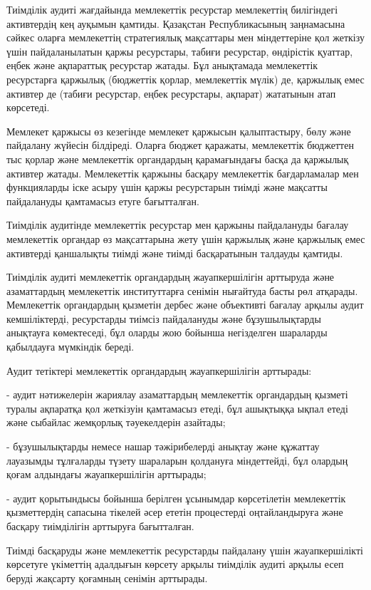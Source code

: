 \begin{multicols}{2}
Тиімділік аудиті жағдайында мемлекеттік ресурстар мемлекеттің
билігіндегі активтердің кең ауқымын қамтиды. Қазақстан Республикасының
заңнамасына сәйкес оларға мемлекеттің стратегиялық мақсаттары мен
міндеттеріне қол жеткізу үшін пайдаланылатын қаржы ресурстары, табиғи
ресурстар, өндірістік қуаттар, еңбек және ақпараттық ресурстар жатады.
Бұл анықтамада мемлекеттік ресурстарға қаржылық (бюджеттік қорлар,
мемлекеттік мүлік) де, қаржылық емес активтер де (табиғи ресурстар,
еңбек ресурстары, ақпарат) жататынын атап көрсетеді.

Мемлекет қаржысы өз кезегінде мемлекет қаржысын қалыптастыру, бөлу және
пайдалану жүйесін білдіреді. Оларға бюджет қаражаты, мемлекеттік
бюджеттен тыс қорлар және мемлекеттік органдардың қарамағындағы басқа да
қаржылық активтер жатады. Мемлекеттік қаржыны басқару мемлекеттік
бағдарламалар мен функцияларды іске асыру үшін қаржы ресурстарын тиімді
және мақсатты пайдалануды қамтамасыз етуге бағытталған.

Тиімділік аудитінде мемлекеттік ресурстар мен қаржыны пайдалануды
бағалау мемлекеттік органдар өз мақсаттарына жету үшін қаржылық және
қаржылық емес активтерді қаншалықты тиімді және тиімді басқаратынын
талдауды қамтиды.

Тиімділік аудиті мемлекеттік органдардың жауапкершілігін арттыруда және
азаматтардың мемлекеттік институттарға сенімін нығайтуда басты рөл
атқарады. Мемлекеттік органдардың қызметін дербес және объективті
бағалау арқылы аудит кемшіліктерді, ресурстарды тиімсіз пайдалануды және
бұзушылықтарды анықтауға көмектеседі, бұл оларды жою бойынша негізделген
шараларды қабылдауға мүмкіндік береді.

Аудит тетіктері мемлекеттік органдардың жауапкершілігін арттырады:

- аудит нәтижелерін жариялау азаматтардың мемлекеттік органдардың
қызметі туралы ақпаратқа қол жеткізуін қамтамасыз етеді, бұл ашықтыққа
ықпал етеді және сыбайлас жемқорлық тәуекелдерін азайтады;

- бұзушылықтарды немесе нашар тәжірибелерді анықтау және құжаттау
лауазымды тұлғаларды түзету шараларын қолдануға міндеттейді, бұл олардың
қоғам алдындағы жауапкершілігін арттырады;

- аудит қорытындысы бойынша берілген ұсынымдар көрсетілетін мемлекеттік
қызметтердің сапасына тікелей әсер ететін процестерді оңтайландыруға
және басқару тиімділігін арттыруға бағытталған.

Тиімді басқаруды және мемлекеттік ресурстарды пайдалану үшін
жауапкершілікті көрсетуге үкіметтің адалдығын көрсету арқылы тиімділік
аудиті арқылы есеп беруді жақсарту қоғамның сенімін арттырады.


\end{multicols}
